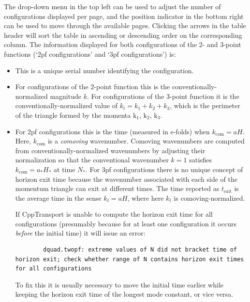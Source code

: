 \documentclass[11pt,a4paper]{article}
\newcommand{\vect}[1]{\bm{\mathrm{{#1}}}}
\newcommand{\Nstar}{N_{\ast}}
\newcommand{\texit}{t_{\text{exit}}}
\newcommand{\astar}{a_{\ast}}
\newcommand{\Hstar}{H_{\ast}}
\newcommand{\kcom}{k_{\text{com}}}
\newcommand{\packagefont}{\sffamily}
\newcommand{\CppTransport}{{\packagefont CppTransport}}
\newcommand{\semibold}[1]{{\fontseries{b}\selectfont{#1}}}
\begin{document}
The drop-down menu in the top left can be used to adjust
the number of configurations displayed per page,
and the
position indicator in the bottom right can be used
to move through the available pages.
Clicking the arrows in the table header
will sort the table in ascending or descending order
on the corresponding column.
The information displayed for both
configurations of the 2- and 3-point functions
(`2pf configurations' and `3pf configurations') is:
\begin{itemize}
    \item \semibold{Serial.} This is a unique serial number identifying
    the configuration.
    
    \item \semibold{Wavenumber $k$.} For configurations of the 2-point function this is
    the conventionally-normalized magnitude $k$.
    For configurations of the 3-point function it is the
    conventionally-normalized
    value of $k_t = k_1 + k_2 + k_3$,
    which is the perimeter of the triangle formed by the momenta
    $\vect{k}_1$, $\vect{k}_2$, $\vect{k}_3$.
    
    \item \semibold{Horizon-exit time $\texit$.}
    For 2pf configurations this is the time
    (measured in e-folds)
    when $\kcom = aH$.
    Here, $\kcom$ is a \emph{comoving} wavenumber.
    Comoving wavenumbers are computed from conventionally-normalized
    wavenumbers by adjusting their normalization so that
    the conventional wavenumber $k=1$
    satisfies $\kcom = \astar \Hstar$
    at time $\Nstar$.
    For 3pf configurations
    there is no unique concept of horizon exit time
    because the wavenumber associated with each side
    of the momentum triangle can exit at different times.
    The time reported as $\texit$ is the average time in the
    sense $k_t = aH$, where here $k_t$ is comoving-normalized.
    
    If {\CppTransport} is unable to compute the horizon exit
    time for all configurations
    (presumably because for at least one configuration it occurs
    \emph{before} the initial time) it will issue an error:
    \begin{verbatim}
        dquad.twopf: extreme values of N did not bracket time of horizon exit; check whether range of N contains horizon exit times for all configurations
    \end{verbatim}
    To fix this it is usually necessary to move the initial time earlier
    while keeping the horizon exit time of the longest mode constant,
    or vice versa.


\end{itemize}
\end{document}
